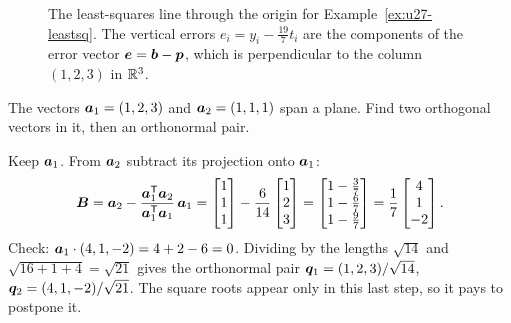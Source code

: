\begin{figure}[ht]\centering
{}
\caption{The least-squares line through the origin for Example~\ref{ex:u27-leastsq}. The
vertical errors $e_i=y_i-\tfrac{19}{7}t_i$ are the components of the error vector
$\boldsymbol{e}=\boldsymbol{b}-\boldsymbol{p}$, which is perpendicular to the column $(1,2,3)$ in $\mathbb{R}^{3}$.}
\label{fig:u27-fit}
\end{figure}

\begin{example}\label{ex:u27-gs}
The vectors $\boldsymbol{a}_1=(1,2,3)$ and $\boldsymbol{a}_2=(1,1,1)$ span a plane. Find two orthogonal
vectors in it, then an orthonormal pair.

Keep $\boldsymbol{a}_1$. From $\boldsymbol{a}_2$ subtract its projection onto $\boldsymbol{a}_1$:
\[
  \boldsymbol{B}=\boldsymbol{a}_2-\frac{\boldsymbol{a}_1^{\mathsf{T}}\boldsymbol{a}_2}{\boldsymbol{a}_1^{\mathsf{T}}\boldsymbol{a}_1}\,\boldsymbol{a}_1
  =\begin{bmatrix} 1\\ 1\\ 1\end{bmatrix}-\frac{6}{14}\begin{bmatrix} 1\\ 2\\ 3\end{bmatrix}
  =\begin{bmatrix} 1-\tfrac37\\ 1-\tfrac67\\ 1-\tfrac97\end{bmatrix}
  =\frac17\begin{bmatrix} 4\\ 1\\ -2\end{bmatrix}.
\]
Check: $\boldsymbol{a}_1\cdot(4,1,-2)=4+2-6=0$. Dividing by the lengths $\sqrt{14}$ and
$\sqrt{16+1+4}=\sqrt{21}$ gives the orthonormal pair
$\boldsymbol{q}_1=(1,2,3)/\sqrt{14}$, $\boldsymbol{q}_2=(4,1,-2)/\sqrt{21}$. The square roots appear only in
this last step, so it pays to postpone it.
\end{example}

